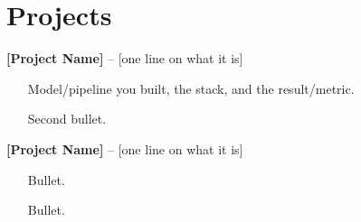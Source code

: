 \documentclass[a4paper,10pt]{article}
\begin{document}
\section*{Projects}
\textbf{[Project Name]} -- [one line on what it is]
\begin{itemize}[leftmargin=*, itemsep=0pt]
  \item [Model/pipeline you built, the stack, and the result/metric.]
  \item [Second bullet.]
\end{itemize}

\textbf{[Project Name]} -- [one line on what it is]
\begin{itemize}[leftmargin=*, itemsep=0pt]
  \item [Bullet.]
  \item [Bullet.]
\end{itemize}
\end{document}
